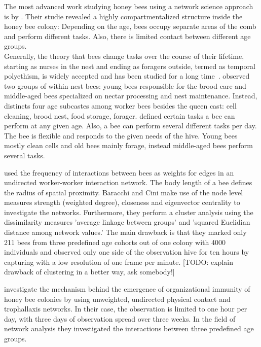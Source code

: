 The most advanced work studying honey bees using a network science approach is by \textcite{baracchi2014socio}.
Their studie revealed a highly compartmentalized structure inside the honey bee colony:
Depending on the age, bees occupy separate areas of the comb and perform different tasks. Also, there is limited contact between different age groups.\\

Generally, the theory that bees change tasks over the course of their lifetime, starting as nurses in the nest and ending as foragers outside, termed as temporal polyethism,  is widely accepted and has been studied for a long time~\cite{seeley1982adaptive, johnson2008within, lindauer1952beitrag}.
\textcite{johnson2008within} observed two groups of within-nest bees: young bees responsible for the brood care and middle-aged bees specialized on nectar processing and nest maintenance. Instead, \textcite{seeley1982adaptive} distincts four age subcastes among worker bees besides the queen cast: cell cleaning, brood nest, food storage, forager. \textcite{lindauer1952beitrag} defined certain tasks a bee can perform at any given age. Also, a bee can perform several different tasks per day. The bee is flexible and responds to the given needs of the hive. Young bees mostly clean cells and old bees mainly forage, instead middle-aged bees perform several tasks.

\textcite{baracchi2014socio} used the frequency of interactions between bees as weights for edges in an undirected worker-worker interaction network. The body length of a bee defines the radius of spatial proximity.
Baracchi and Cini make use of the node level measures strength (weighted degree), closeness and eigenvector centrality to investigate the networks.
Furthermore, they perform a cluster analysis using the dissimilarity measures ’average linkage between groups' and ’squared Euclidian distance among network values.'
The main drawback is that they marked only 211 bees from three predefined age cohorts out of one colony with 4000 individuals and observed only one side of the observation hive for ten hours by capturing with a low resolution of one frame per minute. [TODO: explain drawback of clustering in a better way, ask somebody!]


\textcite{scholl2011olfactory} investigate the mechanism behind the emergence of organizational immunity of honey bee colonies by using unweighted, undirected physical contact and trophallaxis networks.
In their case, the observation is limited to one hour per day, with three days of observation spread over three weeks.
In the field of network analysis they investigated the interactions between three predefined age groups.

